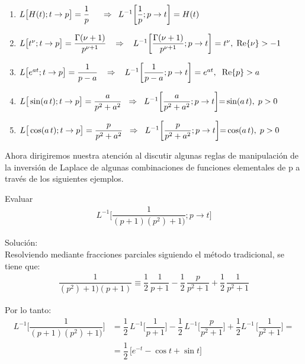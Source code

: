 \begin{enumerate}[label=\alph*)]
\item $ L \big[H(t); t \to p\big] = \dfrac{1}{p} \hspace{0.5cm} \Rightarrow \hspace{0.5em} L^{-1} \bigg[ \dfrac{1}{p}; p \to t \bigg] = H(t)$
\item $ L \big[t^{\nu}; t \to p\big] = \dfrac{\Gamma(\nu + 1)}{p^{\nu + 1}} \hspace{0.3cm} \Rightarrow \hspace{0.3cm} L^{-1} \bigg[ \dfrac{\Gamma(\nu + 1)}{p^{\nu + 1}}; p \to t \bigg] = t^{\nu}, \hspace{0.1cm} \Re{\nu} > - 1$
\item $ L \big[e^{a t}; t \to p\big] = \dfrac{1}{p - a} \hspace{0.3cm} \Rightarrow \hspace{0.3cm} L^{-1} \bigg[ \dfrac{1}{p - a}; p \to t \bigg] = e^{a t}, \hspace{0.2cm} \Re{p} > a$
\item $ L \big[\sin (a \, t); t \to p\big] = \dfrac{a}{p^{2} + a^{2}} \hspace{0.2cm} \Rightarrow \hspace{0.2cm} L^{-1} \bigg[ \dfrac{a}{p^{2} + a^{2}}; p \to t \bigg] {=} \sin (a \, t), \hspace{0.1cm} p > 0$
\item $ L \big[\cos (a \, t); t \to p\big] = \dfrac{p}{p^{2} + a^{2}} \hspace{0.2cm} \Rightarrow \hspace{0.2cm} L^{-1} \bigg[ \dfrac{p}{p^{2} + a^{2}}; p \to t \bigg] {=} \cos (a \, t), \hspace{0.1cm} p > 0$
\end{enumerate}
Ahora dirigiremos nuestra atención al discutir algunas reglas de manipulación de la inversión de Laplace de algunas combinaciones de funciones elementales de p a través de los siguientes ejemplos.
\begin{ejemplo}
Evaluar
\begin{align*}
L^{-1} \bigg[ \dfrac{1}{(p + 1)(p^2) + 1)}; p \to t \bigg]
\end{align*}

Solución:
\\[0.5em]
Resolviendo mediante fracciones parciales siguiendo el método tradicional, se tiene que:
\begin{align*}
\dfrac{1}{(p^2) + 1)(p + 1)} \equiv \dfrac{1}{2} \, \dfrac{1}{p + 1} - \dfrac{1}{2} \, \dfrac{p}{p^{2} + 1} + \dfrac{1}{2} \, \dfrac{1}{p^{2} + 1}
\end{align*}

Por lo tanto:
\begin{align*}
L^{-1} \bigg[ \dfrac{1}{(p + 1)(p^2) + 1)}\bigg] &= \dfrac{1}{2} \, L^{-1} \bigg[ \dfrac{1}{p + 1}\bigg] {-} \dfrac{1}{2} \, L^{-1} \bigg[\dfrac{p}{p^{2} + 1} \bigg] {+} \dfrac{1}{2} L^{-1} \, \bigg[\dfrac{1}{p^{2} + 1} \bigg] = \\[0.5em]
&= \dfrac{1}{2} \, \big[ e^{-t} - \cos t + \sin t \big]
\end{align*}
\end{ejemplo}

